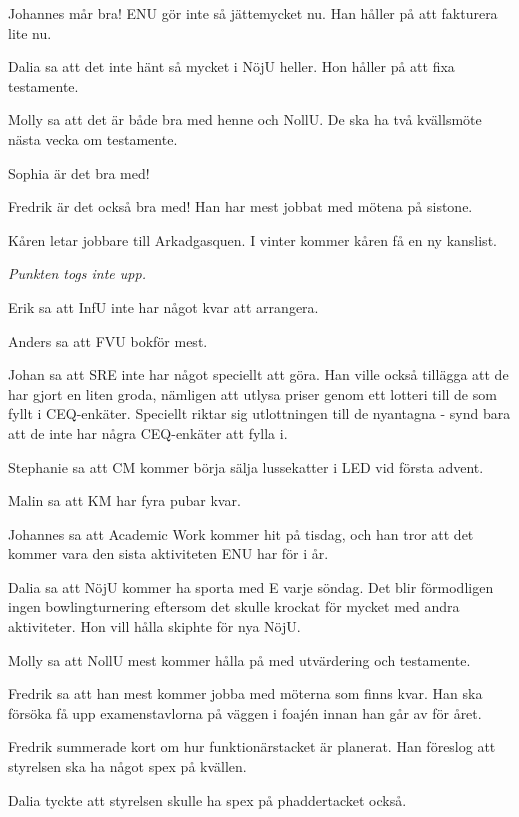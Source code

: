 \documentclass[10pt]{article}
\begin{document}
\begin{paragrafer}
\begin{paragrafer}
Johannes mår bra! ENU gör inte så jättemycket nu. Han håller på att fakturera lite nu.

Dalia sa att det inte hänt så mycket i NöjU heller. Hon håller på att fixa testamente.

Molly sa att det är både bra med henne och NollU. De ska ha två kvällsmöte nästa vecka om testamente.

Sophia är det bra med!

Fredrik är det också bra med! Han har mest jobbat med mötena på sistone.

Kåren letar jobbare till Arkadgasquen. I vinter kommer kåren få en ny kanslist.

\emph{Punkten togs inte upp.}

\end{paragrafer}

Erik sa att InfU inte har något kvar att arrangera.

Anders sa att FVU bokför mest.

Johan sa att SRE inte har något speciellt att göra. Han ville också tillägga att de har gjort en liten groda, nämligen att utlysa priser genom ett lotteri till de som fyllt i CEQ-enkäter. Speciellt riktar sig utlottningen till de nyantagna - synd bara att de inte har några CEQ-enkäter att fylla i.

Stephanie sa att CM kommer börja sälja lussekatter i LED vid första advent.

Malin sa att KM har fyra pubar kvar.

Johannes sa att Academic Work kommer hit på tisdag, och han tror att det kommer vara den sista aktiviteten ENU har för i år.

Dalia sa att NöjU kommer ha sporta med E varje söndag. Det blir förmodligen ingen bowlingturnering eftersom det skulle krockat för mycket med andra aktiviteter. Hon vill hålla skiphte för nya NöjU.

Molly sa att NollU mest kommer hålla på med utvärdering och testamente.

Fredrik sa att han mest kommer jobba med möterna som finns kvar. Han ska försöka få upp examenstavlorna på väggen i foajén innan han går av för året.

Fredrik summerade kort om hur funktionärstacket är planerat. Han föreslog att styrelsen ska ha något spex på kvällen.

Dalia tyckte att styrelsen skulle ha spex på phaddertacket också.


\end{paragrafer}
\end{document}

